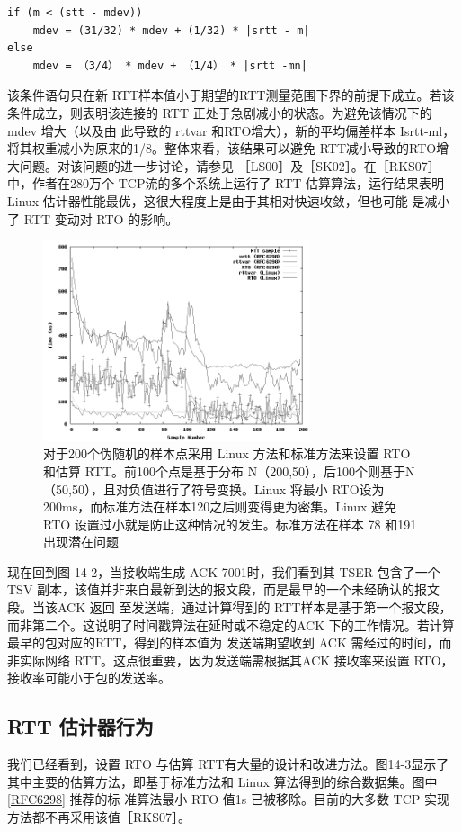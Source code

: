 \begin{lstlisting}[]
if (m < (stt - mdev))
    mdev = (31/32) * mdev + (1/32) * |srtt - m|
else
    mdev = （3/4） * mdev + （1/4） * |srtt -mn|
\end{lstlisting}

该条件语句只在新 RTT样本值小于期望的RTT测量范围下界的前提下成立。若该条件成立，则表明该连接的 RTT
正处于急剧减小的状态。为避免该情况下的 mdev 增大（以及由
此导致的 rttvar 和RTO增大），新的平均偏差样本 Isrtt-ml，将其权重减小为原来的1/8。整体来看，该结果可以避免
RTT减小导致的RTO增大问题。对该问题的进一步讨论，请参见
［LS00］及［SK02］。在［RKS07］中，作者在280万个 TCP流的多个系统上运行了 RTT 估算算法，运行结果表明 Linux
估计器性能最优，这很大程度上是由于其相对快速收敛，但也可能
是减小了 RTT 变动对 RTO 的影响。

\begin{figure}[!htb]
\centering
\includegraphics[width=0.7\textwidth]{imgs/14/14-3.png}
\caption{对于200个伪随机的样本点采用 Linux 方法和标准方法来设置 RTO 和估算 RTT。前100个点是基于分布
N（200,50），后100个则基于N（50,50），且对负值进行了符号变换。Linux 将最小
RTO设为200ms，而标准方法在样本120之后则变得更为密集。Linux 避免 RTO 设置过小就是防止这种情况的发生。标准方法在样本
78 和191 出现潜在问题}
\end{figure}

现在回到图 14-2，当接收端生成 ACK 7001时，我们看到其 TSER 包含了一个 TSV
副本，该值并非来自最新到达的报文段，而是最早的一个未经确认的报文段。当该ACK 返回
至发送端，通过计算得到的 RTT样本是基于第一个报文段，而非第二个。这说明了时间戳算法在延时或不稳定的ACK
下的工作情况。若计算最早的包对应的RTT，得到的样本值为
发送端期望收到 ACK 需经过的时间，而非实际网络 RTT。这点很重要，因为发送端需根据其ACK 接收率来设置 RTO，接收率可能小于包的发送率。

\subsection{RTT 估计器行为}
我们已经看到，设置 RTO 与估算 RTT有大量的设计和改进方法。图14-3显示了其中主要的估算方法，即基于标准方法和 Linux
算法得到的综合数据集。图中\href{https://www.rfc-editor.org/rfc/rfc6298}{[RFC6298]} 推荐的标
准算法最小 RTO 值1s 已被移除。目前的大多数 TCP 实现方法都不再采用该值［RKS07］。

